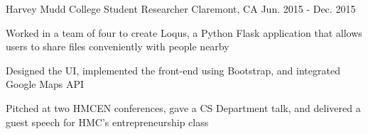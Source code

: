 \begin{cventries}
  \cventry
    {Harvey Mudd College} %
    {Student Researcher} %
    {Claremont, CA} %
    {Jun. 2015 - Dec. 2015} %
    {
      \begin{cvitems} %
        \item {Worked in a team of four to create Loqus, a Python Flask
        application that allows users to share files conveniently with people
        nearby}
        \item {Designed the UI, implemented the front-end using Bootstrap, and
        integrated Google Maps API}
        \item {Pitched at two HMCEN conferences, gave a CS Department
        talk, and delivered a guest speech for HMC's entrepreneurship class}
      \end{cvitems}
    }

\end{cventries}
